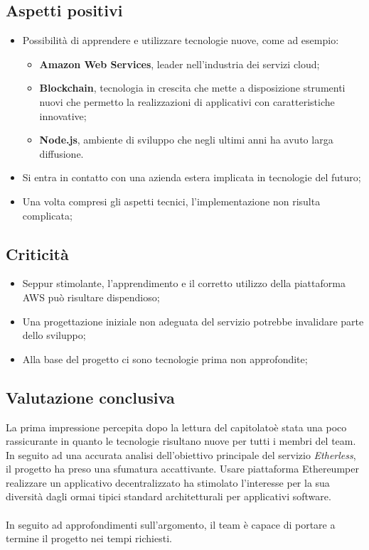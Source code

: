 \subsection{Aspetti positivi}
\begin{itemize}
	\item Possibilità di apprendere e utilizzare tecnologie nuove, come ad esempio:
		\begin{itemize}
			\item \textbf{Amazon Web Services}, leader nell'industria dei servizi cloud\glo;
			\item \textbf{Blockchain\glo}, tecnologia in crescita che mette a disposizione strumenti nuovi che permetto la realizzazioni di applicativi con caratteristiche innovative;
			\item \textbf{Node.js}, ambiente di sviluppo che negli ultimi anni ha avuto larga diffusione.
		\end{itemize}
	\item Si entra in contatto con una azienda estera implicata in tecnologie del futuro;
	\item Una volta compresi gli aspetti tecnici, l'implementazione non risulta complicata;
\end{itemize}

\subsection{Criticità}
\begin{itemize}
	\item Seppur stimolante, l'apprendimento e il corretto utilizzo della piattaforma AWS può risultare dispendioso;
	\item Una progettazione iniziale non adeguata del servizio potrebbe invalidare parte dello sviluppo;
	\item Alla base del progetto ci sono tecnologie prima non approfondite;
\end{itemize}

\subsection{Valutazione conclusiva}
La prima impressione percepita dopo la lettura del capitolato\glo è stata una poco rassicurante in quanto le tecnologie risultano nuove per tutti i membri del team. In seguito ad una accurata analisi dell'obiettivo principale del servizio \textit{Etherless}, il progetto ha preso una sfumatura accattivante. Usare piattaforma Ethereum\glo per realizzare un applicativo decentralizzato ha stimolato l'interesse per la sua diversità dagli ormai tipici standard architetturali per applicativi software.
\\\\
In seguito ad approfondimenti sull'argomento, il team è capace di portare a termine il progetto nei tempi richiesti.